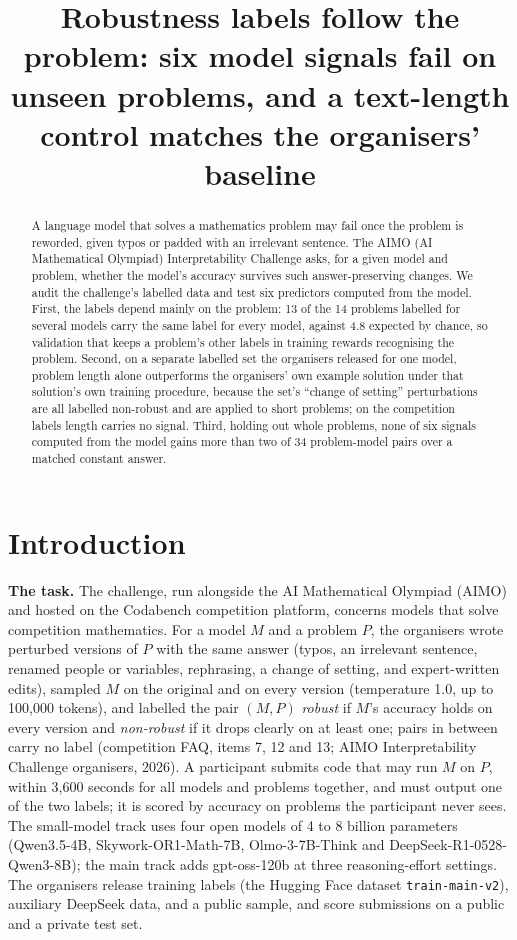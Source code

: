 \documentclass{article}
\title{Robustness labels follow the problem: six model signals fail on unseen problems, and a text-length control matches the organisers' baseline}
\author{}
\begin{document}
\maketitle

\begin{abstract}
A language model that solves a mathematics problem may fail once the problem is reworded, given typos or padded with an irrelevant sentence. The AIMO (AI Mathematical Olympiad) Interpretability Challenge asks, for a given model and problem, whether the model's accuracy survives such answer-preserving changes. We audit the challenge's labelled data and test six predictors computed from the model. First, the labels depend mainly on the problem: 13 of the 14 problems labelled for several models carry the same label for every model, against 4.8 expected by chance, so validation that keeps a problem's other labels in training rewards recognising the problem. Second, on a separate labelled set the organisers released for one model, problem length alone outperforms the organisers' own example solution under that solution's own training procedure, because the set's ``change of setting'' perturbations are all labelled non-robust and are applied to short problems; on the competition labels length carries no signal. Third, holding out whole problems, none of six signals computed from the model gains more than two of 34 problem-model pairs over a matched constant answer.
\end{abstract}

\section{Introduction}

\textbf{The task.} The challenge, run alongside the AI Mathematical Olympiad (AIMO) and hosted on the Codabench competition platform, concerns models that solve competition mathematics. For a model $M$ and a problem $P$, the organisers wrote perturbed versions of $P$ with the same answer (typos, an irrelevant sentence, renamed people or variables, rephrasing, a change of setting, and expert-written edits), sampled $M$ on the original and on every version (temperature 1.0, up to 100,000 tokens), and labelled the pair $(M, P)$ \emph{robust} if $M$'s accuracy holds on every version and \emph{non-robust} if it drops clearly on at least one; pairs in between carry no label (competition FAQ, items 7, 12 and 13; AIMO Interpretability Challenge organisers, 2026). A participant submits code that may run $M$ on $P$, within 3,600 seconds for all models and problems together, and must output one of the two labels; it is scored by accuracy on problems the participant never sees. The small-model track uses four open models of 4 to 8 billion parameters (Qwen3.5-4B, Skywork-OR1-Math-7B, Olmo-3-7B-Think and DeepSeek-R1-0528-Qwen3-8B); the main track adds gpt-oss-120b at three reasoning-effort settings. The organisers release training labels (the Hugging Face dataset \texttt{train-main-v2}), auxiliary DeepSeek data, and a public sample, and score submissions on a public and a private test set.
\end{document}

